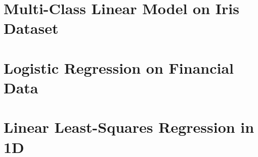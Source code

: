 \documentclass[12pt, a4 paper]{article}
\begin{document}
\section{Multi-Class Linear Model on Iris Dataset}
\label{sec:bayes20D}

\label{prob:2.i}



\label{prob:2.ii}


\section{Logistic Regression on Financial Data}
\label{sec:german}



\section{Linear Least-Squares Regression in 1D}
\label{sec:linearRegression}



\end{document}

